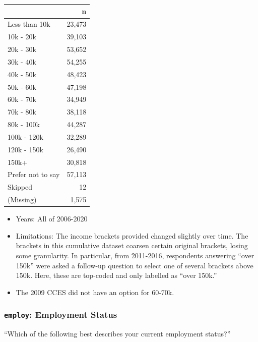 \documentclass[10pt,article,oneside]{memoir}
\theoremstyle{definition}
\begin{document}
\begin{table}[H]
\centering
\begin{tabular}{lr}
\toprule
 & n\\
\midrule
Less than 10k & 23,473\\
10k - 20k & 39,103\\
20k - 30k & 53,652\\
30k - 40k & 54,255\\
40k - 50k & 48,423\\
50k - 60k & 47,198\\
60k - 70k & 34,949\\
70k - 80k & 38,118\\
80k - 100k & 44,287\\
100k - 120k & 32,289\\
120k - 150k & 26,490\\
150k+ & 30,818\\
Prefer not to say & 57,113\\
Skipped & 12\\
(Missing) & 1,575\\
\bottomrule
\end{tabular}
\end{table}

\begin{itemize}
\tightlist
\item
  Years: All of 2006-2020
\item
  Limitations: The income brackets provided changed slightly over time.
  The brackets in this cumulative dataset coarsen certain original
  brackets, losing some granularity. In particular, from 2011-2016,
  respondents answering ``over 150k'' were asked a follow-up question to
  select one of several brackets above 150k. Here, these are top-coded
  and only labelled as ``over 150k.''
\item
  The 2009 CCES did not have an option for 60-70k.
\end{itemize}

\hypertarget{employ-employment-status}{%
\subsubsection{\texorpdfstring{\texttt{employ}: Employment
Status}{employ: Employment Status}}\label{employ-employment-status}}

``Which of the following best describes your current employment
status?''
\end{document}
